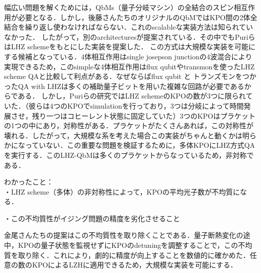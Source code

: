 幅広い問題を解くためには，QbMs（量子分岐マシン）の全結合のスピン相互作用が必要となる．しかし，後藤さんたちのオリジナルのQbMではKPO間の2体全結合を繰り返し使わなければならない．これのscalableな実装方法は知られていなかった．
したがって，別のarchitecturesが提案されている．その中でもPuriらはLHZ schemeをもとにした実装を提案した．
この方式は大規模な実装を可能にする候補となっている．4体相互作用はsingle josepson junctionの4波混合により実現できるため，このsimpleな4体相互作用はflux qubitやtransmonを使ったLHZ scheme QAと比較して利点がある．なぜならばflux qubit と トランズモンをつかったQA with LHZは多くの補助量子ビットを用いた複雑な回路が必要であるからである．
しかし，Puriらの研究ではLHZ schemeのKPOの数が3つに限られていた．（彼らは4つのKPOでsimulationを行っており，3つは分岐によって時間発展させ，残り一つはコヒーレント状態に固定していた）3つのKPOはプラケットの1つの中にあり，対称性がある．プラケットがたくさんあれば，この対称性が壊れる．したがって，大規模な系を考えた場合この実装がちゃんと動くかは明らかになっていない．この重要な問題を検証するために，多体KPOにLHZ方式QAを実行する．このLHZ-QbMは多くのプラケットからなっているため，非対称である．

わかったこと：\\

・LHZ scheme（多体）の非対称性によって，KPOの平均光子数が不均質になる．


・この不均質性がイジング問題の精度を劣化させること

金尾さんたちの提案はこの不均質性を取り除くことである．量子断熱変化の途中，KPOの量子状態を監視せずにKPOのdetuningを調整することで，この不均質を取り除く．これにより，劇的に精度が向上することを数値的に確かめた．任意の数のKPOによるLZHに適用できるため，大規模な実装を可能にする．
